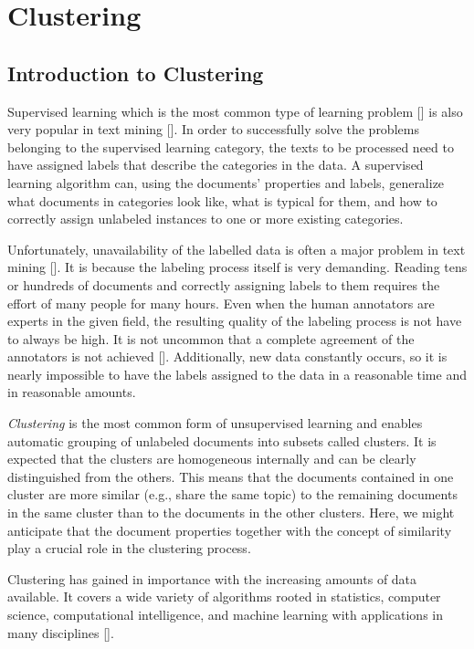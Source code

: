 \chapter{Clustering}
\section{Introduction to Clustering}
Supervised learning which is the most common type of learning problem [\cite{ref71}] is also very popular in text mining [\cite{ref245}]. In order to successfully solve the problems belonging to the supervised learning category, the texts to be processed need to have assigned labels that describe the categories in the data. A supervised learning algorithm can, using the documents' properties and labels, generalize what documents in categories look like, what is typical for them, and how to correctly assign unlabeled instances to one or more existing categories.

Unfortunately, unavailability of the labelled data is often a major problem in text mining [\cite{ref228}]. It is because the labeling process itself is very demanding. Reading tens or hundreds of documents and correctly assigning labels to them requires the effort of many people for many hours. Even when the human annotators are experts in the given field, the resulting quality of the labeling process is not have to always be high. It is not uncommon that a complete agreement of the annotators is not achieved [\cite{ref239}]. Additionally, new data constantly occurs, so it is nearly impossible to have the labels assigned to the data in a reasonable time and in reasonable amounts.

\textit{Clustering} is the most common form of unsupervised learning and enables automatic grouping of unlabeled documents into subsets called clusters. It is expected that the clusters are homogeneous internally and can be clearly distinguished from the others. This means that the documents contained in one cluster are more similar (e.g., share the same topic) to the remaining documents in the same cluster than to the documents in the other clusters. Here, we might anticipate that the document properties together with the concept of similarity play a crucial role in the clustering process.

Clustering has gained in importance with the increasing amounts of data available. It covers a wide variety of algorithms rooted in statistics, computer science, computational intelligence, and machine learning with applications in many disciplines [\cite{ref285}].

